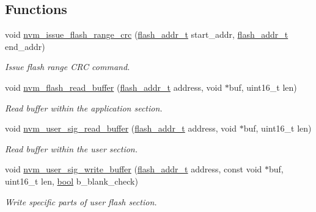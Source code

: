 \subsection*{Functions}
\begin{DoxyCompactItemize}
\item 
void \hyperlink{group__nvm__flash__group_ga335244745ba451fade7e5a0215aaef4f}{nvm\-\_\-issue\-\_\-flash\-\_\-range\-\_\-crc} (\hyperlink{group__nvm__flash__group_ga95a069fc064dc9cd089b7d9047b909b0}{flash\-\_\-addr\-\_\-t} start\-\_\-addr, \hyperlink{group__nvm__flash__group_ga95a069fc064dc9cd089b7d9047b909b0}{flash\-\_\-addr\-\_\-t} end\-\_\-addr)
\begin{DoxyCompactList}\small\item\em Issue flash range C\-R\-C command. \end{DoxyCompactList}\item 
void \hyperlink{group__nvm__flash__group_gae5fd84639f16bdf897cf3ed4e634634f}{nvm\-\_\-flash\-\_\-read\-\_\-buffer} (\hyperlink{group__nvm__flash__group_ga95a069fc064dc9cd089b7d9047b909b0}{flash\-\_\-addr\-\_\-t} address, void $\ast$buf, uint16\-\_\-t len)
\begin{DoxyCompactList}\small\item\em Read buffer within the application section. \end{DoxyCompactList}\item 
void \hyperlink{group__nvm__flash__group_gaf16cad66506bd55382a66c83e0aa0c23}{nvm\-\_\-user\-\_\-sig\-\_\-read\-\_\-buffer} (\hyperlink{group__nvm__flash__group_ga95a069fc064dc9cd089b7d9047b909b0}{flash\-\_\-addr\-\_\-t} address, void $\ast$buf, uint16\-\_\-t len)
\begin{DoxyCompactList}\small\item\em Read buffer within the user section. \end{DoxyCompactList}\item 
void \hyperlink{group__nvm__flash__group_ga5a18a268987412df30e291fa4e43e37f}{nvm\-\_\-user\-\_\-sig\-\_\-write\-\_\-buffer} (\hyperlink{group__nvm__flash__group_ga95a069fc064dc9cd089b7d9047b909b0}{flash\-\_\-addr\-\_\-t} address, const void $\ast$buf, uint16\-\_\-t len, \hyperlink{group__group__xmega__utils_ga97a80ca1602ebf2303258971a2c938e2}{bool} b\-\_\-blank\-\_\-check)
\begin{DoxyCompactList}\small\item\em Write specific parts of user flash section. \end{DoxyCompactList}\item 

\end{DoxyCompactItemize}
